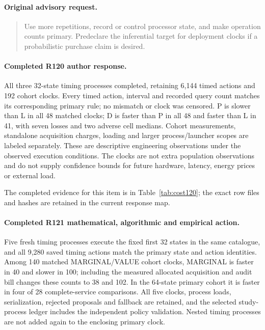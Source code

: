 \paragraph{Original advisory request.}
\begin{quote}
Use more repetitions, record or control processor state, and make operation counts primary. Predeclare the inferential target for deployment clocks if a probabilistic purchase claim is desired.
\end{quote}

\paragraph{Completed R120 author response.}
All three 32-state timing processes completed, retaining 6,144 timed actions and 192 cohort clocks. Every timed action, interval and recorded query count matches its corresponding primary rule; no mismatch or clock was censored. P is slower than L in all 48 matched clocks; D is faster than P in all 48 and faster than L in 41, with seven losses and two adverse cell medians. Cohort measurements, standalone acquisition charges, loading and larger process/launcher scopes are labeled separately. These are descriptive engineering observations under the observed execution conditions. The clocks are not extra population observations and do not supply confidence bounds for future hardware, latency, energy prices or external load.

The completed evidence for this item is in Table~\ref{tab:cost120}; the exact row files and hashes are retained in the current response map.

\paragraph{Completed R121 mathematical, algorithmic and empirical action.}
Five fresh timing processes execute the fixed first 32 states in the same catalogue, and all 9,280 saved timing actions match the primary state and action identities. Among 140 matched MARGINAL/VALUE cohort clocks, MARGINAL is faster in 40 and slower in 100; including the measured allocated acquisition and audit bill changes these counts to 38 and 102. In the 64-state primary cohort it is faster in four of 28 complete-service comparisons. All five clocks, process loads, serialization, rejected proposals and fallback are retained, and the selected study-process ledger includes the independent policy validation. Nested timing processes are not added again to the enclosing primary clock.


